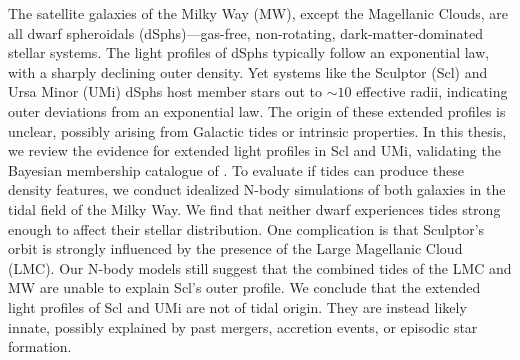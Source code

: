 The satellite galaxies of the Milky Way (MW), except the Magellanic
Clouds, are all dwarf spheroidals (dSphs)---gas-free, non-rotating,
dark-matter-dominated stellar systems. The light profiles of dSphs
typically follow an exponential law, with a sharply declining outer
density. Yet systems like the Sculptor (Scl) and Ursa Minor (UMi) dSphs
host member stars out to \({\sim}10\) effective radii, indicating outer
deviations from an exponential law. The origin of these extended
profiles is unclear, possibly arising from Galactic tides or intrinsic
properties. In this thesis, we review the evidence for extended light
profiles in Scl and UMi, validating the Bayesian membership catalogue of
\citet{jensen+2024}. To evaluate if tides can produce these density
features, we conduct idealized N-body simulations of both galaxies in
the tidal field of the Milky Way. We find that neither dwarf experiences
tides strong enough to affect their stellar distribution. One
complication is that Sculptor's orbit is strongly influenced by the
presence of the Large Magellanic Cloud (LMC). Our N-body models still
suggest that the combined tides of the LMC and MW are unable to explain
Scl's outer profile. We conclude that the extended light profiles of Scl
and UMi are not of tidal origin. They are instead likely innate,
possibly explained by past mergers, accretion events, or episodic star
formation.
